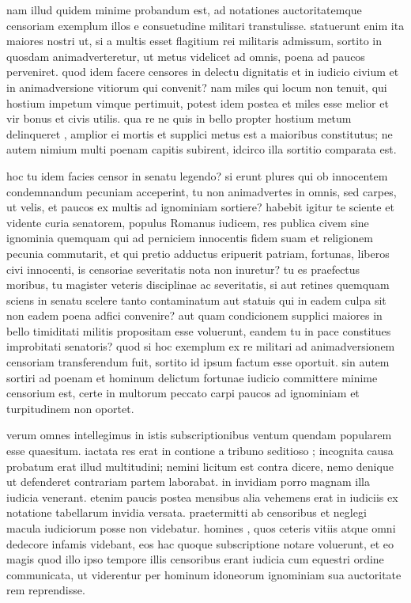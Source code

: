  nam illud quidem minime probandum est, ad notationes auctoritatemque censoriam exemplum illos e consuetudine militari transtulisse. statuerunt enim ita maiores nostri ut, si a multis esset flagitium rei militaris admissum, sortito in quosdam animadverteretur, ut metus videlicet ad omnis, poena ad paucos perveniret. quod idem facere censores in delectu dignitatis et in iudicio civium et in animadversione vitiorum qui convenit? nam miles qui locum non tenuit, qui hostium impetum vimque pertimuit, potest idem postea et miles esse melior et vir bonus et civis utilis. qua re ne quis in bello propter hostium metum delinqueret , amplior ei mortis et supplici metus est a maioribus constitutus; ne autem nimium multi poenam capitis subirent, idcirco illa sortitio comparata est.

 hoc tu idem facies censor in senatu legendo? si erunt plures qui ob innocentem condemnandum pecuniam acceperint, tu non animadvertes in omnis, sed carpes, ut velis, et paucos ex multis ad ignominiam sortiere? habebit igitur te sciente et vidente curia senatorem, populus Romanus iudicem, res publica civem sine ignominia quemquam qui ad perniciem innocentis fidem suam et religionem pecunia commutarit, et qui pretio adductus eripuerit patriam, fortunas, liberos civi innocenti, is censoriae severitatis nota non inuretur? tu es praefectus moribus, tu magister veteris disciplinae ac severitatis, si aut retines quemquam sciens in senatu scelere tanto contaminatum aut statuis qui in eadem culpa sit non eadem poena adfici convenire? aut quam condicionem supplici maiores in bello timiditati militis propositam esse voluerunt, eandem tu in pace constitues improbitati senatoris? quod si hoc exemplum ex re militari ad animadversionem censoriam transferendum fuit, sortito id ipsum factum esse oportuit. sin autem sortiri ad poenam et hominum delictum fortunae iudicio committere minime censorium est, certe in multorum peccato carpi paucos ad ignominiam et turpitudinem non oportet.

 verum omnes intellegimus in istis subscriptionibus ventum quendam popularem esse quaesitum. iactata res erat in contione a tribuno seditioso ; incognita causa probatum erat illud multitudini; nemini licitum est contra dicere, nemo denique ut defenderet contrariam partem laborabat. in invidiam porro magnam illa iudicia venerant. etenim paucis postea mensibus alia vehemens erat in iudiciis ex notatione tabellarum invidia versata. praetermitti ab censoribus et neglegi macula iudiciorum posse non videbatur. homines , quos ceteris vitiis atque omni dedecore infamis videbant, eos hac quoque subscriptione notare voluerunt, et eo magis quod illo ipso tempore illis censoribus erant iudicia cum equestri ordine communicata, ut viderentur per hominum idoneorum ignominiam sua auctoritate rem reprendisse.

